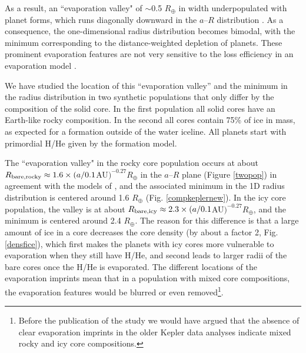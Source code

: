 \documentclass[]{emulateapj}
\def\rearth{R_{\oplus}}
\begin{document}
As a result, an ``evaporation valley" of $\sim$0.5 $R_{\oplus}$ in width underpopulated with planet forms, which runs diagonally downward in the $a$--$R$ distribution \citep{Owen2013,Lopez2013,Jin2014,LopezRice2016}. As a consequence, the one-dimensional radius distribution becomes bimodal, with the minimum  corresponding to the distance-weighted depletion of planets. These prominent evaporation features are not very sensitive to the loss efficiency in an evaporation model \citep{Jin2014}.

We have studied the location of this ``evaporation valley'' and the minimum in the radius distribution in two synthetic  populations that only differ by the composition of the solid core. In the first population all solid cores have an Earth-like rocky composition. In the second all cores contain 75\% of ice in mass, as expected for a formation outside of the water iceline. All planets start  with primordial H/He given by the formation model.

The ``evaporation valley" in the rocky core population occurs at about $R_{\rm bare,rocky}\approx1.6 \times (a/0.1$AU$)^{-0.27} R_{\oplus}$ in the $a$--$R$ plane (Figure \ref{twopop}) in agreement with the models of \citet{LopezRice2016}, and the associated minimum in the 1D radius distribution is centered around 1.6 $\rearth$ (Fig. \ref{compkeplernew}). In the icy core population, the valley is at about $R_{\rm bare,icy}\approx2.3 \times (a/0.1$AU$)^{-0.27} R_{\oplus}$, and the minimum is centered around 2.4 $\rearth$.  The reason for this difference is that a large amount of ice in a core decreases the core density (by about a factor 2, Fig. \ref{densfice}), which first makes the planets with icy cores more vulnerable to evaporation when they still have H/He, and second leads to larger radii of the bare cores once the H/He is evaporated. The different locations of the evaporation imprints mean that in a population with mixed core compositions, the evaporation features would be blurred or even removed\footnote{Before the publication of the \citet{Fulton2017} study we would have argued that the absence of clear evaporation imprints in the older Kepler data analyses \citep[e.g.,][]{Petigura2013} indicate mixed rocky and icy core compositions. }.
\end{document}
